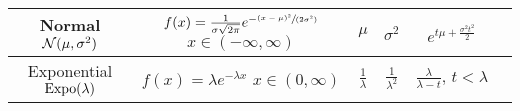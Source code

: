 \begin{tabular}{cccccc}
    \hline
    \shortstack{Normal \\ $\mathcal{N}(\mu, \sigma^2)$} & \shortstack{$f(x) = \frac{1}{\sigma \sqrt{2\pi}} e^{-\sfrac{(x - \mu)^2}{(2 \sigma^2)}}$ \\ $x \in (-\infty, \infty)$} & $\mu$  & $\sigma^2$ & $e^{t\mu + \frac{\sigma^2t^2}{2}}$\\
    \hline
    \shortstack{Exponential \\ $\textrm{Expo}(\lambda)$} & \shortstack{$f(x) = \lambda e^{-\lambda x}$\\$ x \in (0, \infty)$} & $\frac{1}{\lambda}$  & $\frac{1}{\lambda^2}$ & $\frac{\lambda}{\lambda - t}, \, t < \lambda$\\
    \hline
\end{tabular}